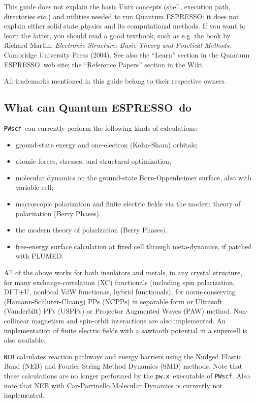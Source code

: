 \documentclass[12pt,a4paper]{article}
\def\qe{{\sc Quantum ESPRESSO}}
\def\pw.x{\texttt{pw.x}}
\def\PWscf{\texttt{PWscf}}
\begin{document}
This guide does not explain the basic Unix concepts (shell, execution 
path, directories etc.) and utilities needed to run \qe; it does not 
explain either solid state physics and its computational methods.
If you want to learn the latter, you should read a good textbook, 
such as e.g. the book by Richard Martin:
{\em Electronic Structure: Basic Theory and Practical Methods},
Cambridge University Press (2004). See also the ``Learn'' section in
the \qe\ web site; the ``Reference Papers'' 
section in the Wiki.

All trademarks mentioned in this guide belong to their respective owners.

\subsection{What can \qe\ do}

\PWscf\ can currently perform the following kinds of calculations:
\begin{itemize}
  \item ground-state energy and one-electron (Kohn-Sham) orbitals;
  \item atomic forces, stresses, and structural optimization;
  \item molecular dynamics on the ground-state Born-Oppenheimer surface,  also with variable cell;
  \item macroscopic polarization and finite electric fields via 
  the modern theory of polarization (Berry Phases).
  \item the modern theory of polarization (Berry Phases).
  \item free-energy surface calculation at fixed cell through meta-dynamics, if patched with PLUMED.
\end{itemize}
All of the above works for both insulators and metals, 
in any crystal structure, for many exchange-correlation (XC) functionals
(including spin polarization, DFT+U, nonlocal VdW functionas,
hybrid functionals), for
norm-conserving (Hamann-Schluter-Chiang) PPs (NCPPs) in 
separable form or Ultrasoft (Vanderbilt) PPs (USPPs)
or Projector Augmented Waves (PAW) method.
Non-collinear magnetism and spin-orbit interactions 
are also implemented.  An implementation of finite electric 
fields with a sawtooth potential in a supercell is also available.

\texttt{NEB} calculates reaction pathways and energy barriers 
using the Nudged Elastic Band (NEB) and Fourier String Method Dynamics 
(SMD) methods. Note that these calculations are no longer performed
by the \pw.x\ executable of \PWscf. Also note that NEB with Car-Parrinello
Molecular Dynamics is currently not implemented.
\end{document}

